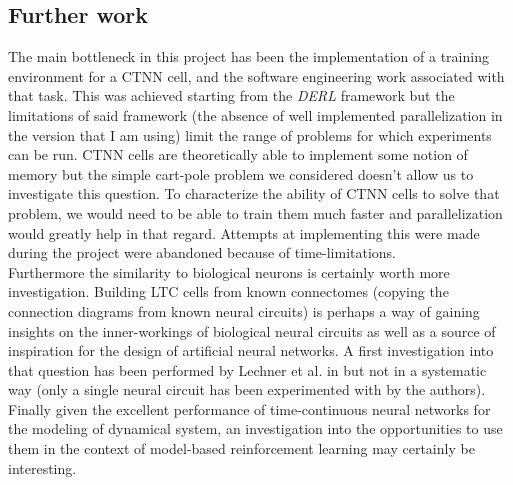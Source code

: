 \subsection{Further work}

The main bottleneck in this project has been the implementation of a training environment for a CTNN cell, and the software engineering work associated with that task. 
This was achieved starting from the \textit{DERL} framework but the limitations of said framework (the absence of well implemented parallelization in the version that I am using) limit the range of problems for which experiments can be run. CTNN cells are theoretically able to implement some notion of memory but the simple cart-pole problem we considered doesn't allow us to investigate this question. To characterize the ability of CTNN cells to solve that problem, we would need to be able to train them much faster and parallelization would greatly help in that regard. Attempts at implementing this were made during the project were abandoned because of time-limitations. \\

Furthermore the similarity to biological neurons is certainly worth more investigation. Building LTC cells from known connectomes (copying the connection diagrams from known neural circuits) is perhaps a way of gaining insights on the inner-workings of biological neural circuits as well as a source of inspiration for the design of artificial neural networks. A first investigation into that question has been performed by Lechner et al. in \cite{Lechner2019wormInspiredNN} but not in a systematic way (only a single neural circuit has been experimented with by the authors). \\

Finally given the excellent performance of time-continuous neural networks for the modeling of dynamical system, an investigation into the opportunities to use them in the context of model-based reinforcement learning may certainly be interesting.